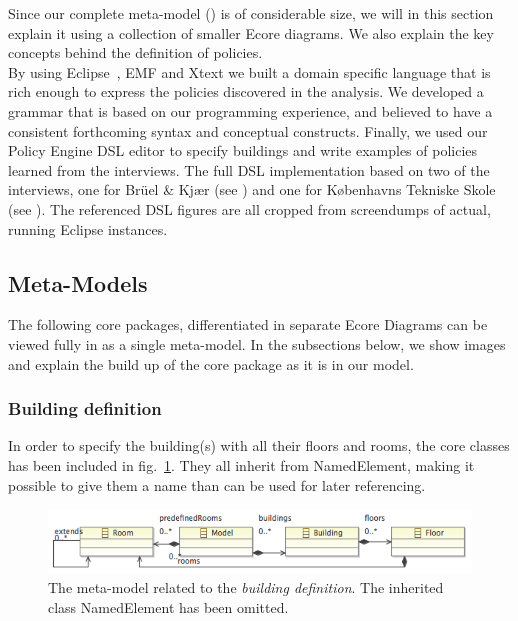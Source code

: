 Since our complete meta-model () is of considerable size, we will in this section explain it using a collection of smaller Ecore diagrams. We also explain the key concepts behind the definition of policies.\\
 
By using Eclipse~\cite{eclipse}, EMF and Xtext we built a domain specific language that is rich enough to express the policies discovered in the analysis. We developed a grammar that is based on our programming experience, and believed to have a consistent forthcoming syntax and conceptual constructs. Finally, we used our Policy Engine DSL editor to specify buildings and write examples of policies learned from the interviews. The full DSL implementation based on two of the interviews, one for Br\"{u}el \& Kj\ae r (see ) and one for K\o benhavns Tekniske Skole (see ). The referenced DSL figures are all cropped from screendumps of actual, running Eclipse instances.

\subsection{Meta-Models}

The following core packages, differentiated in separate Ecore Diagrams can be viewed fully in  as a single meta-model. In the subsections below, we show images and explain the build up of the core package as it is in our model. 

\subsubsection{Building definition}
In order to specify the building(s) with all their floors and rooms, the core classes has been included in fig. \ref{fig:ecore-building-definition}. They all inherit from NamedElement, making it possible to give them a name than can be used for later referencing.
\begin{figure}[h]
  \centering \includegraphics[scale=.5]{ecore-building-definition.png}  
	\caption{The meta-model related to the \textit{building definition}. The inherited class NamedElement has been omitted.}
	\label{fig:ecore-building-definition}
\end{figure}

